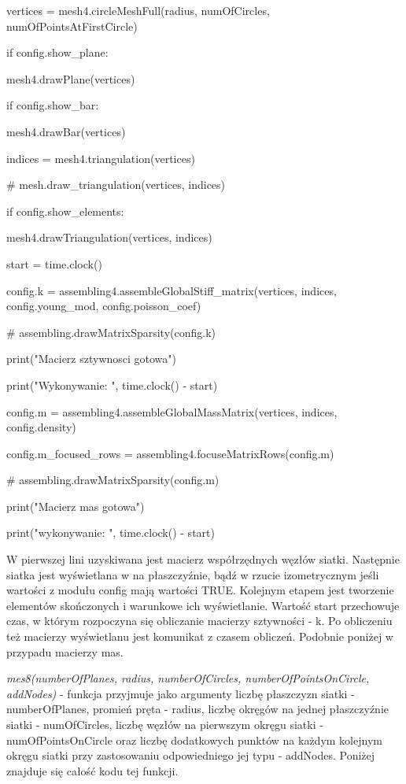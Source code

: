 \vspace {3mm}

    vertices = mesh4.circleMeshFull(radius, numOfCircles, numOfPointsAtFirstCircle)

    if config.show\_plane:

        mesh4.drawPlane(vertices)

    if config.show\_bar:

        mesh4.drawBar(vertices)

\vspace {3mm}
    indices = mesh4.triangulation(vertices)

    \# mesh.draw\_triangulation(vertices, indices)

    if config.show\_elements:

        mesh4.drawTriangulation(vertices, indices)

\vspace {3mm}
    start = time.clock()

    config.k = assembling4.assembleGlobalStiff\_matrix(vertices, indices, config.young\_mod, config.poisson\_coef)

    \# assembling.drawMatrixSparsity(config.k)

    print("Macierz sztywnosci gotowa")

    print("Wykonywanie: ", time.clock() - start)

\vspace {3mm}
    config.m = assembling4.assembleGlobalMassMatrix(vertices, indices, config.density)

    config.m\_focused\_rows = assembling4.focuseMatrixRows(config.m)

    \# assembling.drawMatrixSparsity(config.m)

    print("Macierz mas gotowa")

    print("wykonywanie: ", time.clock() - start)

\vspace {3mm}

W pierwszej lini uzyskiwana jest macierz współrzędnych węzłów siatki. Następnie siatka jest wyświetlana w na płaszczyźnie, bądź w rzucie izometrycznym jeśli wartości z modułu config mają wartości TRUE. Kolejnym etapem jest tworzenie elementów skończonych i warunkowe ich wyświetlanie. Wartość start przechowuje czas, w którym rozpoczyna się obliczanie macierzy sztywności - k. Po obliczeniu też macierzy wyświetlanu jest komunikat z czasem obliczeń.  Podobnie poniżej w przypadu macierzy mas.

\textit{mes8(numberOfPlanes, radius, numberOfCircles, numberOfPointsOnCircle, addNodes)} - funkcja przyjmuje jako argumenty liczbę płaszczyzn siatki - numberOfPlanes, promień pręta - radius, liczbę okręgów na jednej płaszczyźnie siatki - numOfCircles, liczbę węzłów na pierwszym okręgu siatki - numOfPointsOnCircle oraz liczbę dodatkowych punktów na każdym kolejnym okręgu siatki przy zastosowaniu odpowiedniego jej typu - addNodes. Poniżej znajduje się całość kodu tej funkcji.


